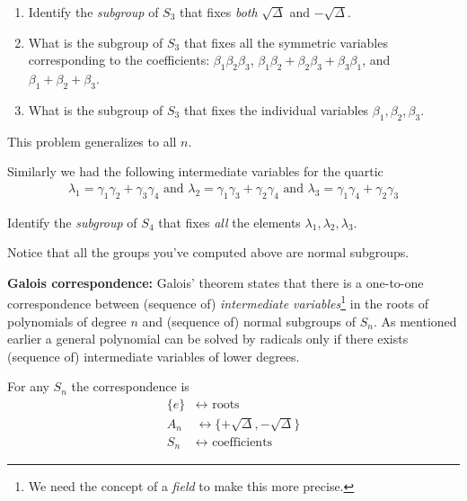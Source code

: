 \begin{questions}[resume]
  \item \begin{enumerate}
  \label{ques:cubic}
    \item Identify the \emph{subgroup} of $ S_3$ that fixes \emph{both} $\sqrt{\Delta} $ and $-\sqrt{\Delta}$.
    \item What is the subgroup of $ S_3$ that fixes all the symmetric variables corresponding to the coefficients: $ \beta_1 \beta_2 \beta_3$, $\beta_1 \beta_2 + \beta_2 \beta_3 + \beta_3 \beta_1$, and $\beta_1 + \beta_2 + \beta_3$.
    \item What is the subgroup of $ S_3$ that fixes the individual variables $\beta_1 , \beta_2,  \beta_3 $.
  \end{enumerate}
  This problem generalizes to all $ n$.
\end{questions}

Similarly we had the following intermediate variables for the quartic
  \begin{align*}
    \lambda_1 = \gamma_1 \gamma_2 + \gamma_3 \gamma_4 
    \mbox{ and } \lambda_2 = \gamma_1 \gamma_3 + \gamma_2 \gamma_4
    \mbox{ and } \lambda_3 = \gamma_1 \gamma_4 + \gamma_2 \gamma_3 
  \end{align*}

\begin{questions}[resume]
  \item 
  \label{ques:quartic}
Identify the \emph{subgroup} of $ S_4$ that fixes \emph{all} the elements $ \lambda_1, \lambda_2, \lambda_3$. 
\end{questions}

Notice that all the groups you've computed above are normal subgroups. 

\newpage 
\noindent \textbf{Galois correspondence: } Galois' theorem states that there is a one-to-one correspondence between (sequence of) \emph{intermediate variables}\footnote{We need the concept of a \emph{field} to make this more precise.} in the roots of polynomials of degree $ n$ and (sequence of) normal subgroups of $ S_n$. As mentioned earlier a {general} polynomial can be solved by radicals only if there exists (sequence of) intermediate variables of lower degrees.

For any $ S_n$ the correspondence is
\begin{align*}
  \{ e \} & \leftrightarrow  \mbox{ roots }   \\
  A_n & \leftrightarrow \{ +\sqrt{\Delta}, -\sqrt{\Delta} \} \\
  S_n & \leftrightarrow \mbox{ coefficients }
\end{align*}


